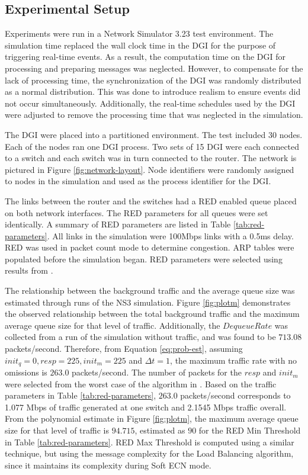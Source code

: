 \subsection{Experimental Setup}
\label{sect:experimentalsetup}

Experiments were run in a Network Simulator 3.23\cite{NS3} test environment.
The simulation time replaced the wall clock time in the \ac{DGI} for the purpose of triggering real-time events.
As a result, the computation time on the \ac{DGI} for processing and preparing messages was neglected.
However, to compensate for the lack of processing time, the synchronization of the \ac{DGI} was randomly distributed as a normal distribution.
This was done to introduce realism to ensure events did not occur simultaneously.
Additionally, the real-time schedules used by the \ac{DGI} were adjusted to remove the processing time that was neglected in the simulation.

The \ac{DGI} were placed into a partitioned environment.
The test included 30 nodes.
Each of the nodes ran one \ac{DGI} process.
Two sets of 15 \ac{DGI} were each connected to a switch and each switch was in turn connected to the router.
The network is pictured in Figure \ref{fig:network-layout}.
Node identifiers were randomly assigned to nodes in the simulation and used as the process identifier for the \ac{DGI}.

The links between the router and the switches had a \ac{RED} enabled queue placed on both network interfaces.
The \ac{RED} parameters for all queues were set identically.
A summary of \ac{RED} parameters are listed in Table \ref{tab:red-parameters}.
All links in the simulation were 100Mbps links with a 0.5ms delay.
RED was used in packet count mode to determine congestion.
ARP tables were populated before the simulation began.
\ac{RED} parameters were selected using results from \cite{JOURNAL}.

The relationship between the background traffic and the average queue size was estimated through runs of the \ac{NS3} simulation.
Figure \ref{fig:plotm} demonstrates the observed relationship between the total background traffic and the maximum average queue size for that level of traffic.
Additionally, the $DequeueRate$ was collected from a run of the simulation without traffic, and was found to be $713.08$ packets/second.
Therefore, from Equation \ref{eq:prob-est}, assuming $init_q=0, resp=225, init_m=225$ and $\Delta t=1$, the maximum traffic rate with no omissions is $263.0$ packets/second.
The number of packets for the $resp$ and $init_m$ were selected from the worst case of the algorithm in \cite{JOURNAL}.
Based on the traffic parameters in Table \ref{tab:red-parameters}, $263.0$ packets/second corresponds to 1.077 Mbps of traffic generated at one switch and 2.1545 Mbps traffic overall.
From the polynomial estimate in Figure \ref{fig:plotm}, the maximum average queue size for that level of traffic is $94.715$, estimated as $90$ for the \ac{RED} Min Threshold in Table \ref{tab:red-parameters}.
RED Max Threshold is computed using a similar technique, but using the message complexity for the Load Balancing algorithm, since it maintains its complexity during Soft ECN mode.

